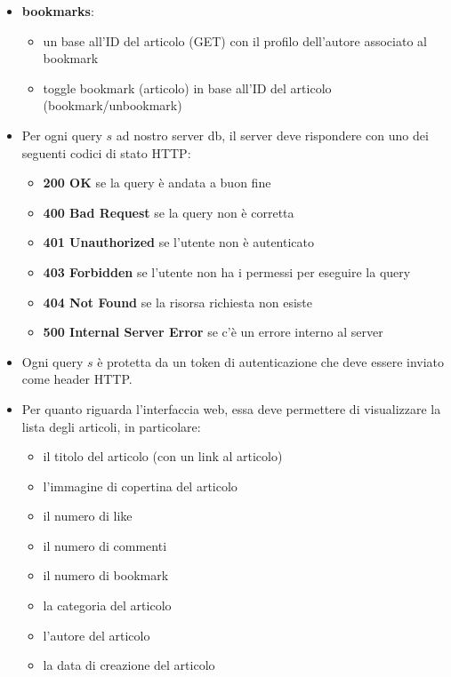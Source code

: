 \documentclass{article}
\begin{document}
\begin{itemize}
\begin{itemize}
        \end{itemize}
        \item \textbf{bookmarks}:
        \begin{itemize}
            \item un base all'ID del articolo (GET) con il profilo dell'autore associato al bookmark
            \item toggle bookmark (articolo) in base all'ID del articolo (bookmark/unbookmark)
        \end{itemize}
        \item Per ogni query $s$ ad nostro server db, il server deve rispondere con uno dei seguenti codici di stato HTTP:
        \begin{itemize}
            \item \textbf{200 OK} se la query è andata a buon fine
            \item \textbf{400 Bad Request} se la query non è corretta
            \item \textbf{401 Unauthorized} se l'utente non è autenticato
            \item \textbf{403 Forbidden} se l'utente non ha i permessi per eseguire la query
            \item \textbf{404 Not Found} se la risorsa richiesta non esiste
            \item \textbf{500 Internal Server Error} se c'è un errore interno al server
        \end{itemize}
        \item Ogni query $s$ è protetta da un token di autenticazione che deve essere inviato come header HTTP.
        \item Per quanto riguarda l'interfaccia web, essa deve permettere di visualizzare la lista degli articoli, in particolare:
        \begin{itemize}
            \item il titolo del articolo (con un link al articolo)
            \item l'immagine di copertina del articolo
            \item il numero di like
            \item il numero di commenti
            \item il numero di bookmark
            \item la categoria del articolo
            \item l'autore del articolo
            \item la data di creazione del articolo

\end{itemize}
\end{itemize}
\end{document}
